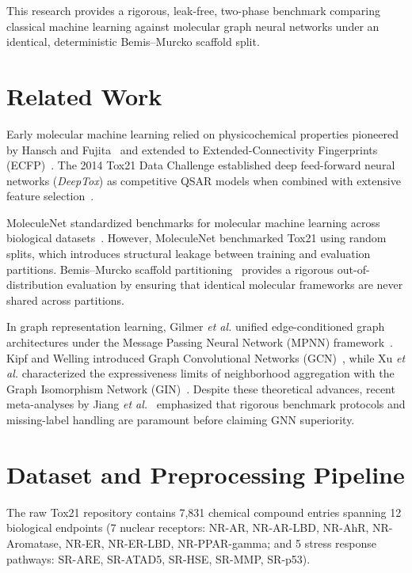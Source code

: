 \documentclass[conference]{IEEEtran}
\begin{document}
This research provides a rigorous, leak-free, two-phase benchmark comparing classical machine learning against molecular graph neural networks under an identical, deterministic Bemis--Murcko scaffold split.

\section{Related Work}
Early molecular machine learning relied on physicochemical properties pioneered by Hansch and Fujita~\cite{hansch1964rho} and extended to Extended-Connectivity Fingerprints (ECFP)~\cite{rogers2010ecfp}. The 2014 Tox21 Data Challenge established deep feed-forward neural networks (\textit{DeepTox}) as competitive QSAR models when combined with extensive feature selection~\cite{mayr2016deeptox}.

MoleculeNet standardized benchmarks for molecular machine learning across biological datasets~\cite{wu2018moleculenet}. However, MoleculeNet benchmarked Tox21 using random splits, which introduces structural leakage between training and evaluation partitions. Bemis--Murcko scaffold partitioning~\cite{bemis1996frameworks} provides a rigorous out-of-distribution evaluation by ensuring that identical molecular frameworks are never shared across partitions.

In graph representation learning, Gilmer \textit{et al.} unified edge-conditioned graph architectures under the Message Passing Neural Network (MPNN) framework~\cite{gilmer2017mpnn}. Kipf and Welling introduced Graph Convolutional Networks (GCN)~\cite{kipf2017gcn}, while Xu \textit{et al.} characterized the expressiveness limits of neighborhood aggregation with the Graph Isomorphism Network (GIN)~\cite{xu2019gin}. Despite these theoretical advances, recent meta-analyses by Jiang \textit{et al.}~\cite{jiang2021could} emphasized that rigorous benchmark protocols and missing-label handling are paramount before claiming GNN superiority.

\section{Dataset and Preprocessing Pipeline}
The raw Tox21 repository contains 7,831 chemical compound entries spanning 12 biological endpoints (7 nuclear receptors: NR-AR, NR-AR-LBD, NR-AhR, NR-Aromatase, NR-ER, NR-ER-LBD, NR-PPAR-gamma; and 5 stress response pathways: SR-ARE, SR-ATAD5, SR-HSE, SR-MMP, SR-p53).
\end{document}
